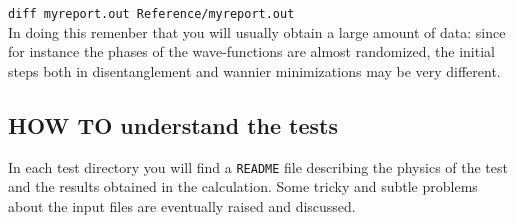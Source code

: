         {\tt diff myreport.out Reference/myreport.out } \\

     \noindent
     In doing this remenber that you will usually obtain a large amount of data:
      since for instance the phases of the wave-functions are almost
      randomized, the initial steps both in disentanglement and wannier minimizations
      may be very different.

\subsection*{HOW TO understand the tests}
     In each test directory you will find a {\tt README} file describing the 
     physics of the test and the results obtained in the calculation.
     Some tricky and subtle problems about the input files 
     are eventually raised and discussed. 

     
  


